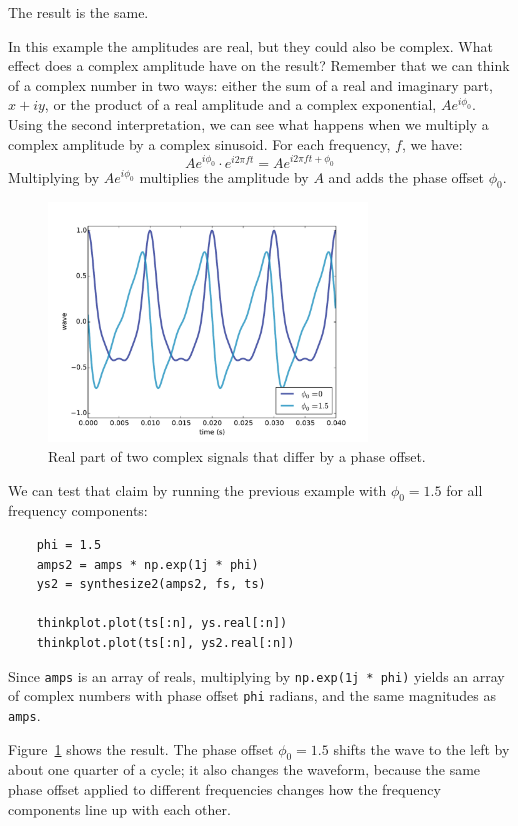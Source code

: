 \documentclass[12pt]{book}
\begin{document}
The result is the same.

In this example the amplitudes are real, but they could also be
complex.  What effect does a complex amplitude have on the result?
Remember that we can think of a complex number in two ways: either the
sum of a real and imaginary part, $x + i y$, or the product of a real
amplitude and a complex exponential, $A e^{i \phi_0}$.  Using the
second interpretation, we can see what happens when we multiply
a complex amplitude by a complex sinusoid.  For each frequency, $f$,
we have:
%
\[ A e^{i \phi_0} \cdot e^{i 2 \pi f t} = A e^{i 2 \pi f t + \phi_0} \]
%
Multiplying by $A e^{i \phi_0}$ multiplies the amplitude by $A$
and adds the phase offset $\phi_0$.

\begin{figure}
\centerline{\includegraphics[height=2.5in]{figs/dft2.pdf}}
\caption{Real part of two complex signals that differ by a phase
offset.}
\label{fig.dft2}
\end{figure}

We can test that claim by running the previous example with
$\phi_0 = 1.5$ for all frequency components:

\begin{verbatim}
    phi = 1.5
    amps2 = amps * np.exp(1j * phi)
    ys2 = synthesize2(amps2, fs, ts)

    thinkplot.plot(ts[:n], ys.real[:n])
    thinkplot.plot(ts[:n], ys2.real[:n])
\end{verbatim}

Since {\tt amps}
is an array of reals, multiplying by {\tt np.exp(1j * phi)} yields
an array of complex numbers with phase offset {\tt phi} radians, and
the same magnitudes as {\tt amps}.

Figure~\ref{fig.dft2} shows the result.  The phase offset
$\phi_0 = 1.5$ shifts the wave to the left by about one quarter of
a cycle; it also changes the waveform, because the same phase
offset applied to different frequencies changes how the frequency
components line up with each other.
\end{document}
